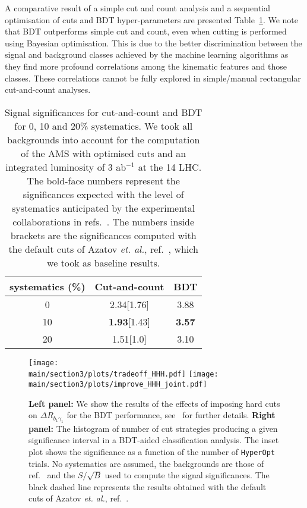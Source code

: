 A comparative result of a simple cut and count analysis and a sequential optimisation of cuts and BDT hyper-parameters are presented  Table~\ref{table:resultsbdtKS}. We note that BDT outperforms simple cut and count, even when cutting is performed using Bayesian optimisation. This is due to the better discrimination between the signal and background classes achieved by the machine learning algorithms as they find more profound correlations among the kinematic features and those classes. These correlations cannot be fully explored in simple/manual rectangular cut-and-count analyses. 

%
\begin{table}[h]
\centering
\begin{tabular}{c|c|c}
\hline
systematics (\%) & Cut-and-count & BDT \\
\hline\hline 
0 & 2.34[1.76] & 3.88 \\
\hline
10 & {\bf 1.93}[1.43] & {\bf 3.57}  \\
\hline
20 & 1.51[1.0] & 3.10  \\
\hline\hline
\end{tabular}
\caption{Signal significances for cut-and-count and BDT for 0, 10 and 20\% systematics. We took all backgrounds into account for the computation of the AMS with optimised cuts and an integrated luminosity of 3 ab$^{-1}$ at the 14 \UTeV LHC. The bold-face numbers represent the significances expected with the level of systematics anticipated by the experimental collaborations in refs.~\cite{ATL-PHYS-PUB-2017-001, CMS}. The numbers inside brackets are the significances computed with the default cuts of Azatov \emph{et. al.}, ref.~\cite{Azatov:2015oxa}, which we took as baseline results.}
\label{table:resultsbdtKS}
\end{table}
%
%
\begin{figure}[!t]
\centering
\texttt{[image: \\main/section3/plots/tradeoff\_HHH.pdf]}
\texttt{[image: \\main/section3/plots/improve\_HHH\_joint.pdf]}
\caption{\textbf{Left panel:}  We show the results of the effects of imposing hard cuts on $\Delta R_{b_1\gamma_1}$ for the BDT performance, see~\cite{Alves:2017ued} for further details. \textbf{Right panel:} The histogram of number of cut strategies producing a given significance interval in a BDT-aided classification analysis. The inset plot shows the significance as a function of the number of \texttt{HyperOpt} trials. No systematics are assumed, the backgrounds are those of ref.~\cite{Azatov:2015oxa} and the $S/\sqrt{B}$ used to compute the signal significances. The black dashed line represents the results obtained with the default cuts of Azatov \emph{et. al.}, ref.~\cite{Azatov:2015oxa}.}
\label{fig:8resultsKS}
\end{figure}
